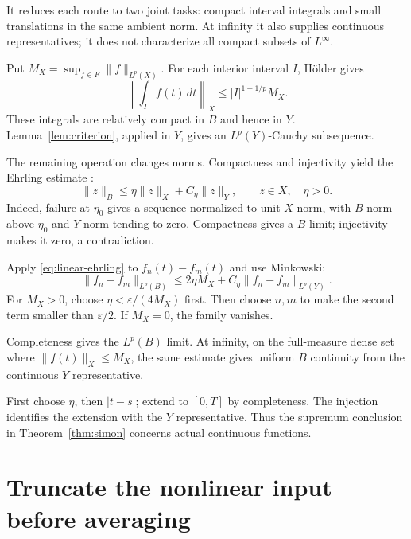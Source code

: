 \documentclass[12pt,reqno]{amsart}
\begin{document}
It reduces each route to two joint tasks: compact interval integrals and small translations in the same ambient norm. At infinity it also supplies continuous representatives; it does not characterize all compact subsets of $L^\infty$.

Put $M_X=\sup_{f\in F}\|f\|_{L^p(X)}$. For each interior interval $I$, H\"older gives
\[
\left\|\int_I f(t)\,dt\right\|_X\le |I|^{1-1/p}M_X.
\]
These integrals are relatively compact in $B$ and hence in $Y$. Lemma~\ref{lem:criterion}, applied in $Y$, gives an $L^p(Y)$-Cauchy subsequence.

The remaining operation changes norms. Compactness and injectivity yield the Ehrling estimate \cite[Lemma 8, pp.~84--85]{S-simon}:
\begin{equation}\label{eq:linear-ehrling}
\|z\|_B\le\eta\|z\|_X+C_\eta\|z\|_Y,\qquad z\in X,\quad\eta>0.
\end{equation}
Indeed, failure at $\eta_0$ gives a sequence normalized to unit $X$ norm, with $B$ norm above $\eta_0$ and $Y$ norm tending to zero. Compactness gives a $B$ limit; injectivity makes it zero, a contradiction.

Apply \eqref{eq:linear-ehrling} to $f_n(t)-f_m(t)$ and use Minkowski:
\begin{equation}\label{eq:linear-upgrade}
\|f_n-f_m\|_{L^p(B)}
\le2\eta M_X+C_\eta\|f_n-f_m\|_{L^p(Y)}.
\end{equation}
For $M_X>0$, choose $\eta<\varepsilon/(4M_X)$ first. Then choose $n,m$ to make the second term smaller than $\varepsilon/2$. If $M_X=0$, the family vanishes.

Completeness gives the $L^p(B)$ limit. At infinity, on the full-measure dense set where $\|f(t)\|_X\le M_X$, the same estimate gives uniform $B$ continuity from the continuous $Y$ representative.

First choose $\eta$, then $|t-s|$; extend to $[0,T]$ by completeness. The injection identifies the extension with the $Y$ representative. Thus the supremum conclusion in Theorem~\ref{thm:simon} concerns actual continuous functions.

\section{Truncate the nonlinear input before averaging}

\begin{theorem}[Maitre]\label{thm:maitre}

\end{theorem}
\end{document}
